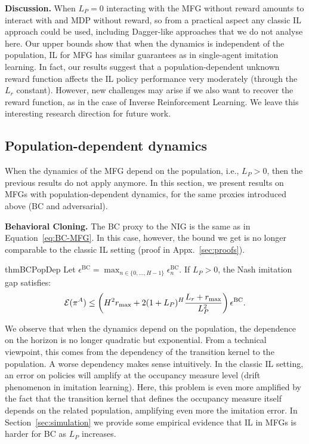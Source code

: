 \documentclass{article}
\begin{document}
\textbf{Discussion.}
When $L_P=0$ interacting with the MFG without reward amounts to interact with and MDP without reward, so from a practical aspect any classic IL approach could be used, including Dagger-like approaches \cite{ross2011reduction} that we do not analyse here. Our upper bounds
show that when the dynamics is independent of the population, IL for MFG has similar guarantees as in single-agent imitation learning.
In fact, our results suggest that a population-dependent unknown reward function affects the IL policy performance very moderately (through the $L_r$ constant). 
However, new challenges may arise if we also want to recover the reward function, as in the case of Inverse Reinforcement Learning.
We leave this interesting research direction for future work.

\subsection{Population-dependent dynamics}
\label{sec:pop-dependent}
When the dynamics of the MFG depend on the population, i.e., $L_P > 0$, then the previous results do not apply anymore. 
In this section, we present results on MFGs with population-dependent dynamics, for the same proxies introduced above (BC and adversarial).

\textbf{Behavioral Cloning.} The BC proxy to the NIG is the same as in Equation~\eqref{eq:BC-MFG}. 
In this case, however, the bound we get is no longer comparable to the classic IL setting (proof in Appx.~\ref{sec:proofs}).
\begin{restatable}{thm}{BCPopDep}
\label{thm:bound-bc-LP-non-zero}
    Let $\epsilon^\mathrm{BC} = \max_{n\in\{0,\dots,H-1\}}\epsilon^\mathrm{BC}_n$.
    If $L_P>0$, the Nash imitation gap satisfies:
    \begin{equation}
        \mathcal{E}(\pi^A) \leq \left(H^2r_\text{max} + 2(1+L_P)^H \frac{L_r + r_{\max}}{L^2_P}\right) \epsilon^\mathrm{BC}.
    \end{equation}
\end{restatable}%
We observe that when the dynamics depend on the population, the dependence on the horizon is no longer quadratic but exponential. From a technical viewpoint, this comes from the dependency of the transition kernel to the population. A worse dependency makes sense intuitively. In the classic IL setting, an error on policies will amplify at the occupancy measure level (drift phenomenon in imitation learning). Here, this problem is even more amplified by the fact that the transition kernel that defines the occupancy measure itself depends on the related population, amplifying even more the imitation error. %
In Section~\ref{sec:simulation} we provide some empirical evidence that IL in MFGs is harder for BC as $L_P$ increases.
\end{document}
